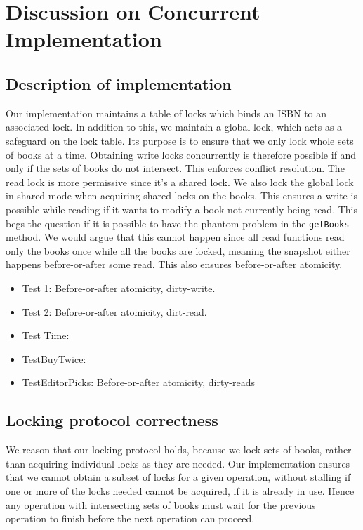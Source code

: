
\section{Discussion on Concurrent Implementation}

\subsection{Description of implementation}
Our implementation maintains a table of locks which binds an ISBN to an
associated lock. In addition to this, we maintain a global lock, which acts as
a safeguard on the lock table. Its purpose is to ensure that we only lock whole
sets of books at a time. Obtaining write locks concurrently is therefore possible
if and only if the sets of books do not intersect. This enforces conflict
resolution. The read lock is more permissive since it's a shared lock. We also lock the global lock in shared mode when acquiring shared locks on the books. This ensures a write is possible while reading if it wants to modify a book not currently being read. This begs the question if it is possible to have the phantom problem in the {\tt getBooks} method. We would argue that this cannot happen since all read functions read only the books once while all the books are locked, meaning the snapshot either happens before-or-after some read. This also ensures before-or-after atomicity.

\begin{itemize}
    \item Test 1: Before-or-after atomicity, dirty-write.
    \item Test 2: Before-or-after atomicity, dirt-read.
    \item Test Time:
    \item TestBuyTwice:
    \item TestEditorPicks: Before-or-after atomicity, dirty-reads
\end{itemize}

\subsection{Locking protocol correctness}
We reason that our locking protocol holds, because we lock sets of books, rather
than acquiring individual locks as they are needed. Our implementation ensures
that we cannot obtain a subset of locks for a given operation, without stalling
if one or more of the locks needed cannot be acquired, if it is already in use.
Hence any operation with intersecting sets of books must wait for the previous
operation to finish before the next operation can proceed.

